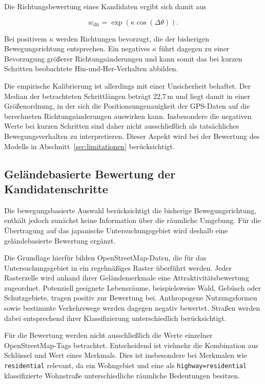 \documentclass[12pt,a4paper]{report}
\begin{document}
Die Richtungsbewertung eines Kandidaten ergibt sich damit aus

\begin{equation}
w_{\mathrm{dir}}
=
\exp\left(
\kappa \cos(\Delta\theta)
\right).
\label{eq:direction_weight}
\end{equation}

Bei positivem $\kappa$ werden Richtungen bevorzugt, die der bisherigen
Bewegungsrichtung entsprechen. Ein negatives $\kappa$ führt dagegen zu einer
Bevorzugung größerer Richtungsänderungen und kann somit das bei kurzen Schritten
beobachtete Hin-und-Her-Verhalten abbilden.

Die empirische Kalibrierung ist allerdings mit einer Unsicherheit behaftet. Der
Median der betrachteten Schrittlängen beträgt 22{,}7\,m und liegt damit in einer
Größenordnung, in der sich die Positionsungenauigkeit der GPS-Daten auf die
berechneten Richtungsänderungen auswirken kann. Insbesondere die negativen Werte
bei kurzen Schritten sind daher nicht ausschließlich als tatsächliches
Bewegungsverhalten zu interpretieren. Dieser Aspekt wird bei der Bewertung des
Modells in Abschnitt~\ref{sec:limitationen} berücksichtigt.

\subsection{Geländebasierte Bewertung der Kandidatenschritte}
\label{subsec:gelaende}

Die bewegungsbasierte Auswahl berücksichtigt die bisherige Bewegungsrichtung,
enthält jedoch zunächst keine Information über die räumliche Umgebung. Für die
Übertragung auf das japanische Untersuchungsgebiet wird deshalb eine
geländebasierte Bewertung ergänzt.

Die Grundlage hierfür bilden OpenStreetMap-Daten, die für das Untersuchungsgebiet
in ein regelmäßiges Raster überführt werden. Jeder Rasterzelle wird anhand ihrer
Geländemerkmale eine Attraktivitätsbewertung zugeordnet. Potenziell geeignete
Lebensräume, beispielsweise Wald, Gebüsch oder Schutzgebiete, tragen positiv zur
Bewertung bei. Anthropogene Nutzungsformen sowie bestimmte Verkehrswege werden
dagegen negativ bewertet. Straßen werden dabei entsprechend ihrer
Klassifizierung unterschiedlich berücksichtigt.

Für die Bewertung werden nicht ausschließlich die Werte einzelner
OpenStreetMap-Tags betrachtet. Entscheidend ist vielmehr die Kombination aus
Schlüssel und Wert eines Merkmals. Dies ist insbesondere bei Merkmalen wie
\texttt{residential} relevant, da ein Wohngebiet und eine als
\texttt{highway=residential} klassifizierte Wohnstraße unterschiedliche
räumliche Bedeutungen besitzen.
\end{document}
